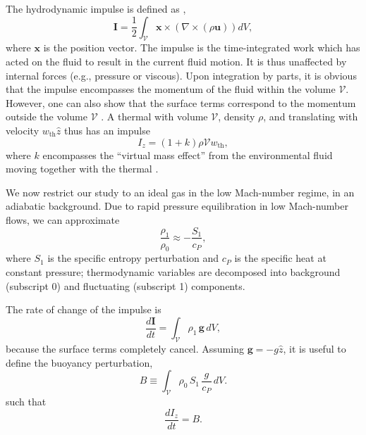 \documentclass[twocolumn, amsmath, amsfonts, amssymb, trackchanges]{aastex62}
\newcommand{\grad}{\ensuremath{\nabla}}
\begin{document}
The hydrodynamic impulse is defined as \citep{shivamoggi2010},
\begin{equation}
\bm{I} = \frac{1}{2}\int_{\mathcal{V}} \bm{x}\times(\grad\times(\rho\bm{u}))dV,
\end{equation}
where $\bm{x}$ is the position vector. 
The impulse is the time-integrated work which has acted on the fluid to result in the current fluid motion.
It is thus unaffected by internal forces (e.g., pressure or viscous).
Upon integration by parts, it is obvious that the impulse encompasses the momentum of the fluid within the volume $\mathcal{V}$.
However, one can also show that the surface terms correspond to the momentum outside the volume $\mathcal{V}$ \citep[e.g.][]{Akhmetov2009}.
A thermal with volume $\mathcal{V}$, density $\rho$, and translating with velocity $w_{\text{th}} \hat{z}$ thus has an impulse
\begin{equation}\label{eqn:momentum}
I_z = (1+k) \rho \mathcal{V} w_{\text{th}},
\end{equation}
where $k$ encompasses the ``virtual mass effect'' from the environmental fluid moving together with the thermal \citep{tarshish&all2018}.

We now restrict our study to an ideal gas in the low Mach-number regime, in an adiabatic background.
Due to rapid pressure equilibration in low Mach-number flows, we can approximate 
\begin{equation*}
\frac{\rho_1}{\rho_0} \approx -\frac{S_1}{c_P},
\end{equation*}
where $S_1$ is the specific entropy perturbation and $c_P$ is the specific heat at constant pressure; thermodynamic variables are decomposed into background (subscript 0) and fluctuating (subscript 1) components.

The rate of change of the impulse is
\begin{equation*}
\frac{d\bm{I}}{d t} = \int_\mathcal{V} \rho_1\, \bm{g}\, dV,
\end{equation*}
because the surface terms completely cancel.
Assuming $\bm{g} = -g\hat{z}$, it is useful to define the buoyancy perturbation,
\begin{equation}
B \equiv \int_{\mathcal{V}} \rho_0\, S_1\, \frac{g}{c_P}\, dV.
\label{eqn:tot_buoyancy}
\end{equation}
such that
\begin{equation}
\frac{d I_z}{d t} = B.
\label{eqn:change_in_impulse}
\end{equation}
\end{document}

